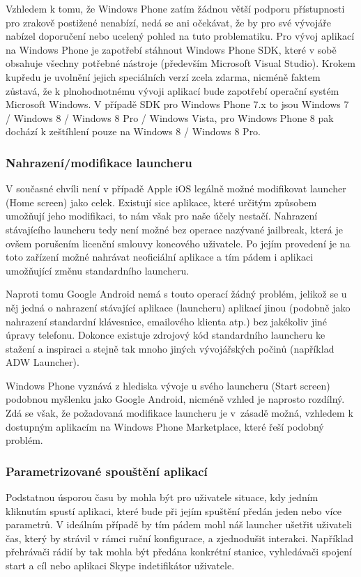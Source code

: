 \documentclass[thesis=M,czech]{FITthesis}[2012/06/26]
\begin{document}
Vzhledem k tomu, že Windows Phone zatím žádnou větší podporu přístupnosti pro zrakově postižené nenabízí, nedá se ani očekávat, že by pro své vývojáře nabízel doporučení nebo ucelený pohled na tuto problematiku. Pro vývoj aplikací na Windows Phone je zapotřebí stáhnout Windows Phone SDK\cite{win_sdk}, které v sobě obsahuje všechny potřebné nástroje\cite{win8_sdk} (především Microsoft Visual Studio). Krokem kupředu je uvolnění jejich speciálních verzí zcela zdarma, nicméně faktem zůstavá, že k plnohodnotnému vývoji aplikací bude zapotřebí operační systém Microsoft Windows. V případě SDK pro Windows Phone 7.x to jsou Windows 7 / Windows 8 / Windows 8 Pro / Windows Vista, pro Windows Phone 8 pak dochází k zeštíhlení pouze na Windows 8 / Windows 8 Pro.

\subsubsection*{Nahrazení/modifikace launcheru}
V současné chvíli není v případě Apple iOS legálně možné modifikovat launcher (Home screen) jako celek. Existují sice aplikace, které určitým způsobem umožňují jeho modifikaci\cite{iphone_shortcuts}, to nám však pro naše účely nestačí. Nahrazení stávajícího launcheru tedy není možné bez operace nazývané jailbreak\cite{ios_jailbreak}, která je ovšem porušením licenční smlouvy koncového uživatele\cite{apple_about_jailbreak}. Po jejím provedení je na toto zařízení možné nahrávat neoficiální aplikace a tím pádem i aplikaci umožňující změnu standardního launcheru\cite{iphone_launcher}.

Naproti tomu Google Android nemá s touto operací žádný problém, jelikož se u něj jedná o nahrazení stávající aplikace (launcheru) aplikací jinou (podobně jako nahrazení standardní klávesnice, emailového klienta atp.) bez jakékoliv jiné úpravy telefonu. Dokonce existuje zdrojový kód standardního launcheru ke stažení a inspiraci\cite{android_launcher} a stejně tak mnoho jiných vývojářských počinů (například ADW Launcher\cite{android_adw_launcher}).

Windows Phone vyznává z hlediska vývoje u svého launcheru (Start screen) podobnou myšlenku jako Google Android, nicméně vzhled je naprosto rozdílný. Zdá se však, že požadovaná modifikace launcheru je v~zásadě možná, vzhledem k dostupným aplikacím na Windows Phone Marketplace, které řeší podobný problém\cite{win_launcher}\cite{win_launcher2}.

\subsubsection*{Parametrizované spouštění aplikací}
Podstatnou úsporou času by mohla být pro uživatele situace, kdy jedním kliknutím spustí aplikaci, které bude při jejím spuštění předán jeden nebo více parametrů. V ideálním případě by tím pádem mohl náš launcher ušetřit uživateli čas, který by strávil v rámci ruční konfigurace, a zjednodušit interakci. Například přehrávači rádií by tak mohla být předána konkrétní stanice, vyhledávači spojení start a cíl nebo aplikaci Skype indetifikátor uživatele.
\end{document}
